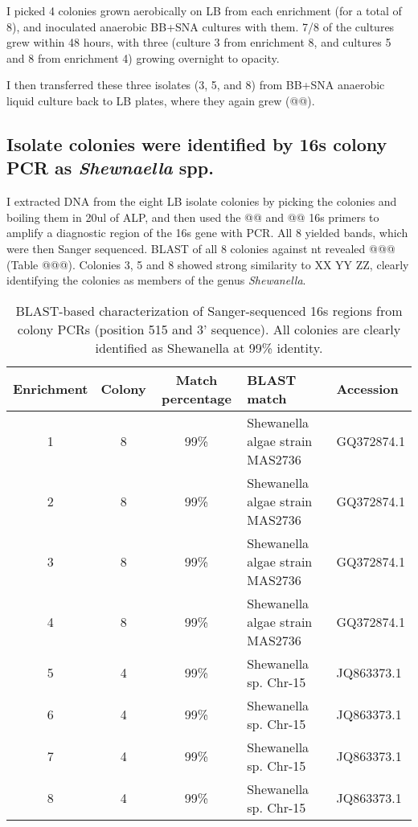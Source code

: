 \documentclass{article}
\begin{document}
I picked 4 colonies grown aerobically on LB from each enrichment (for
a total of 8), and inoculated anaerobic BB+SNA cultures with them.
7/8 of the cultures grew within 48 hours, with three (culture 3 from
enrichment 8, and cultures 5 and 8 from enrichment 4) growing
overnight to opacity.

I then transferred these three isolates (3, 5, and 8) from BB+SNA
anaerobic liquid culture back to LB plates, where they again grew
(@@).

\subsection*{Isolate colonies were identified by 16s colony PCR as {\em Shewnaella} spp.}

I extracted DNA from the eight LB isolate colonies by picking the
colonies and boiling them in 20ul of ALP, and then used
the @@ and @@ 16s primers to amplify a diagnostic region of the 16s
gene with PCR.  All 8 yielded bands, which were then Sanger sequenced.
BLAST of all 8 colonies against nt revealed @@@ (Table @@@).  Colonies
3, 5 and 8 showed strong similarity to XX YY ZZ, clearly identifying
the colonies as members of the genus {\em Shewanella}.

\begin{table}
\centering
\begin{tabular}{|c|c|c|l|l|}
\hline
Enrichment & Colony & Match percentage & BLAST match & Accession \\
\hline
1 &
8 &
99\% &
Shewanella algae strain MAS2736 &
GQ372874.1 \\

2 &
8 &
99\% &
Shewanella algae strain MAS2736 &
GQ372874.1 \\

3 &
8 &
99\% &
Shewanella algae strain MAS2736 &
GQ372874.1 \\

4 &
8 &
99\% &
Shewanella algae strain MAS2736 &
GQ372874.1 \\

5 &
4 &
99\% &
Shewanella sp. Chr-15 &
JQ863373.1 \\

6 &
4 &
99\% &
Shewanella sp. Chr-15 &
JQ863373.1 \\

7 &
4 &
99\% &
Shewanella sp. Chr-15 &
JQ863373.1 \\

8 &
4 &
99\% &
Shewanella sp. Chr-15 &
JQ863373.1 \\
\hline
\end{tabular}
\caption{BLAST-based characterization of Sanger-sequenced 16s regions from colony PCRs (position 515 and 3' sequence).  All colonies are clearly identified as Shewanella at 99\% identity.}
\label{tab:16s}
\end{table}
\end{document}
